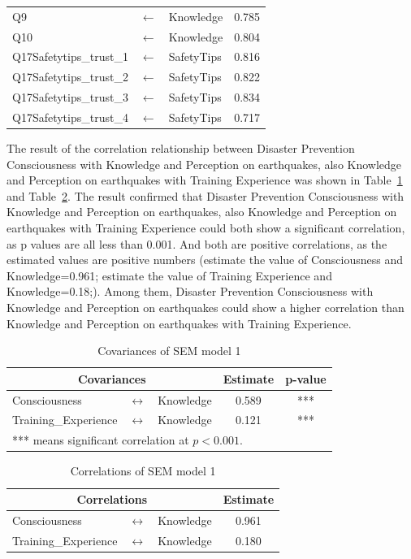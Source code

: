 \begin{table}[h]
\begin{tabular}{lcl|c}
Q9                      &$\longleftarrow$ & Knowledge            & 0.785  \\
Q10                     &$\longleftarrow$ & Knowledge            & 0.804  \\
Q17Safetytips\_trust\_1 &$\longleftarrow$ & SafetyTips           & 0.816  \\
Q17Safetytips\_trust\_2 &$\longleftarrow$ & SafetyTips           & 0.822  \\
Q17Safetytips\_trust\_3 &$\longleftarrow$ & SafetyTips           & 0.834  \\
Q17Safetytips\_trust\_4 &$\longleftarrow$ & SafetyTips           & 0.717  \\
 \hline
  \end{tabular}
\end{table}

The result of the correlation relationship between Disaster Prevention Consciousness with Knowledge and Perception on earthquakes, also Knowledge and Perception on earthquakes with Training Experience was shown in Table~\ref{table13} and Table~\ref{table14}. The result confirmed that Disaster Prevention Consciousness with Knowledge and Perception on earthquakes, also Knowledge and Perception on earthquakes with Training Experience could both show a significant correlation, as p values are all less than 0.001. And both are positive correlations, as the estimated values are positive numbers (estimate the value of Consciousness and Knowledge=0.961; estimate the value of Training Experience and Knowledge=0.18;). Among them, Disaster Prevention Consciousness with Knowledge and Perception on earthquakes could show a higher correlation than Knowledge and Perception on earthquakes with Training Experience. 

\begin{table}[h]
  \caption{Covariances of SEM model 1}
  \label{table13}
  \centering
  \begin{tabular}{lcl|c|c}
  \hline
   \multicolumn{3}{c|}{Covariances} & Estimate & p-value \\
  \hline
  Consciousness & $\longleftrightarrow$ & Knowledge & 0.589 & *** \\
  Training\_Experience & $\longleftrightarrow$ & Knowledge & 0.121 & *** \\
  \hline
\multicolumn{5}{l}{*** means significant correlation at $p<0.001$.}
  \end{tabular}
\end{table}

\begin{table}[h]
  \caption{Correlations of SEM model 1}
  \label{table14}
  \centering
  \begin{tabular}{lcl|c}
  \hline
   \multicolumn{3}{c|}{Correlations} & Estimate \\
  \hline
  Consciousness & $\longleftrightarrow$ & Knowledge & 0.961 \\
  Training\_Experience & $\longleftrightarrow$ & Knowledge & 0.180 \\
  \hline
  \end{tabular}
\end{table}
\cleardoublepage

